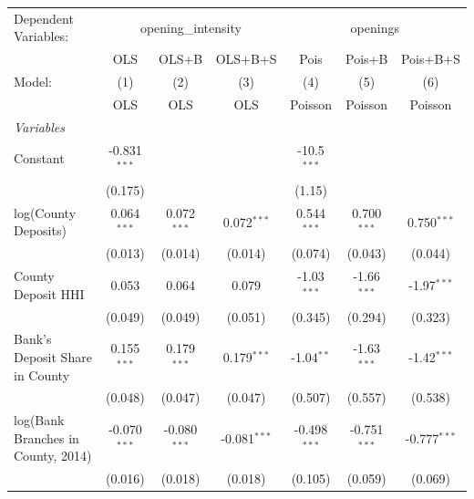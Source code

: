 \begingroup
\centering
\begin{tabular}{lcccccc}
   \tabularnewline \midrule \midrule
   Dependent Variables: & \multicolumn{3}{c}{opening\_intensity} & \multicolumn{3}{c}{openings}\\
                                      & OLS            & OLS+B          & OLS+B+S        & Pois           & Pois+B         & Pois+B+S \\   
   Model:                             & (1)            & (2)            & (3)            & (4)            & (5)            & (6)\\  
                                      &  OLS           & OLS            & OLS            & Poisson        & Poisson        & Poisson\\  
   \midrule
   \emph{Variables}\\
   Constant                           & -0.831$^{***}$ &                &                & -10.5$^{***}$  &                &   \\   
                                      & (0.175)        &                &                & (1.15)         &                &   \\   
   log(County Deposits)               & 0.064$^{***}$  & 0.072$^{***}$  & 0.072$^{***}$  & 0.544$^{***}$  & 0.700$^{***}$  & 0.750$^{***}$\\   
                                      & (0.013)        & (0.014)        & (0.014)        & (0.074)        & (0.043)        & (0.044)\\   
   County Deposit HHI                 & 0.053          & 0.064          & 0.079          & -1.03$^{***}$  & -1.66$^{***}$  & -1.97$^{***}$\\   
                                      & (0.049)        & (0.049)        & (0.051)        & (0.345)        & (0.294)        & (0.323)\\   
   Bank's Deposit Share in County     & 0.155$^{***}$  & 0.179$^{***}$  & 0.179$^{***}$  & -1.04$^{**}$   & -1.63$^{***}$  & -1.42$^{***}$\\   
                                      & (0.048)        & (0.047)        & (0.047)        & (0.507)        & (0.557)        & (0.538)\\   
   log(Bank Branches in County, 2014) & -0.070$^{***}$ & -0.080$^{***}$ & -0.081$^{***}$ & -0.498$^{***}$ & -0.751$^{***}$ & -0.777$^{***}$\\   
                                      & (0.016)        & (0.018)        & (0.018)        & (0.105)        & (0.059)        & (0.069)\\   

\end{tabular}
